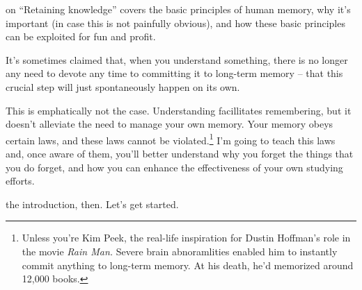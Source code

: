  on ``Retaining knowledge'' covers the basic
principles of human memory, why it's important (in case this is not painfully
obvious), and how these basic principles can be exploited for fun and profit.

It's sometimes claimed that, when you understand something, there is no longer
any need to devote any time to committing it to long-term memory -- that this
crucial step will just spontaneously happen on its own.

This is emphatically not the case. Understanding facillitates remembering, but
it doesn't alleviate the need to manage your own memory. Your memory obeys
certain laws, and these laws cannot be violated.\footnote{Unless you're Kim
  Peek, the real-life inspiration for Dustin Hoffman's role in the movie \textit{Rain Man.} Severe brain abnoramlities enabled him to instantly commit
  anything to long-term memory. At his death, he'd memorized around 12,000 books.} I'm going to teach this laws and, once aware of
them, you'll better understand why you forget the things that you do forget, and
how you can enhance the effectiveness of your own studying efforts.

 the introduction, then. Let's get started.
